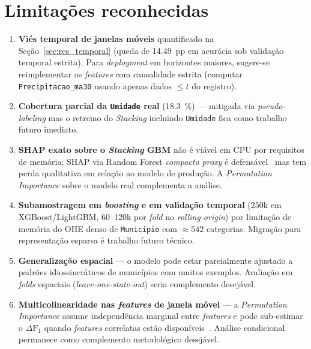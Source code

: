 \section{Limitações reconhecidas}
\label{sec:conclusao_limitacoes}

\begin{enumerate}
  \item \textbf{Viés temporal de janelas móveis} quantificado na Seção~\ref{sec:res_temporal} (queda de \SI{14,49}{pp} em acurácia sob validação temporal estrita). Para \emph{deployment} em horizontes maiores, sugere-se reimplementar as \emph{features} com causalidade estrita (computar \texttt{Precipitacao\_ma30} usando apenas dados \(\leq t\) do registro).

  \item \textbf{Cobertura parcial da \texttt{Umidade} real} (\SI{18,3}{\percent}) --- mitigada via \emph{pseudo-labeling} mas o retreino do \emph{Stacking} incluindo \texttt{Umidade} fica como trabalho futuro imediato.

  \item \textbf{SHAP exato sobre o \emph{Stacking} GBM} não é viável em CPU por requisitos de memória; SHAP via Random Forest \emph{compacto proxy} é defensável~\cite{lundberg2020local} mas tem perda qualitativa em relação ao modelo de produção. A \emph{Permutation Importance} sobre o modelo real complementa a análise.

  \item \textbf{Subamostragem em \emph{boosting} e em validação temporal} (250k em XGBoost/LightGBM, 60--120k por \emph{fold} no \emph{rolling-origin}) por limitação de memória do OHE denso de \texttt{Municipio} com \(\approx 542\) categorias. Migração para representação esparsa é trabalho futuro técnico.

  \item \textbf{Generalização espacial} --- o modelo pode estar parcialmente ajustado a padrões idiossincráticos de municípios com muitos exemplos. Avaliação em \emph{folds} espaciais (\emph{leave-one-state-out}) seria complemento desejável.

  \item \textbf{Multicolinearidade nas \emph{features} de janela móvel} --- a \emph{Permutation Importance} assume independência marginal entre \emph{features} e pode sub-estimar o \(\Delta \text{F}_1\) quando \emph{features} correlatas estão disponíveis~\cite{molnar2022interpretable}. Análise condicional~\cite{hooker2021unrestricted} permanece como complemento metodológico desejável.
\end{enumerate}

